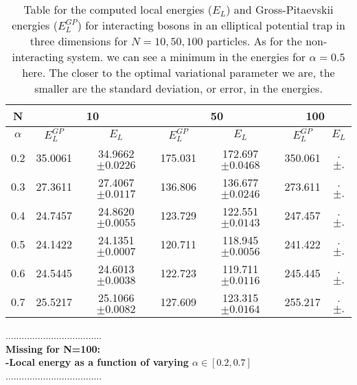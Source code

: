 \documentclass[12pt,a4paper,english]{article}
\begin{document}
\begin{table}[htbp!]
	\centering
	\begin{tabular}{ |c|c|c|c|c|c|c| }
		\hline \rule{0pt}{13pt}
		N & \multicolumn{2}{c|}{10} & \multicolumn{2}{c|}{50} & \multicolumn{2}{c|}{100}\\
		\hline \rule{0pt}{13pt}
		$\alpha$ & $E_L^{GP}$ & $E_L$ & $E_L^{GP}$ & $E_L$ & $E_L^{GP}$ & $E_L$ \\
		\hline \rule{0pt}{13pt}
		0.2 & 35.0061 & 34.9662$\pm0.0226$ & 175.031 & 172.697$\pm0.0468$ & 350.061 & .$\pm.$ \\
		\hline \rule{0pt}{13pt}
		0.3 & 27.3611 & 27.4067$\pm0.0117$ & 136.806 & 136.677$\pm0.0246$ & 273.611 & .$\pm.$ \\
		\hline \rule{0pt}{13pt}
		0.4 & 24.7457 & 24.8620$\pm0.0055$ & 123.729 & 122.551$\pm0.0143$ & 247.457 & .$\pm.$ \\
		\hline \rule{0pt}{13pt}
		0.5 & 24.1422 & 24.1351$\pm0.0007$ & 120.711 & 118.945$\pm0.0056$ & 241.422 & .$\pm.$ \\
		\hline \rule{0pt}{13pt}
		0.6 & 24.5445 & 24.6013$\pm0.0038$ & 122.723 & 119.711$\pm0.0116$ & 245.445 & .$\pm.$ \\
		\hline \rule{0pt}{13pt}
		0.7 & 25.5217 & 25.1066$\pm0.0082$ & 127.609 & 123.315$\pm0.0164$ & 255.217 & .$\pm.$ \\
		\hline
	\end{tabular}	
	\caption{Table for the computed local energies ($E_L$) and Gross-Pitaevskii energies ($E_L^{GP}$) for interacting bosons in an elliptical potential trap in three dimensions for $N=10,50,100$ particles. As for the non-interacting system. we can see a minimum in the energies for $\alpha=0.5$ here. The closer to the optimal variational parameter we are, the smaller are the standard deviation, or error, in the energies.  \label{tab:alpha_int}}
\end{table}

....................................\\
\textbf{Missing for N=100:\\
-Local energy as a function of varying $\alpha\in[0.2,0.7]$}\\
....................................
\end{document}
